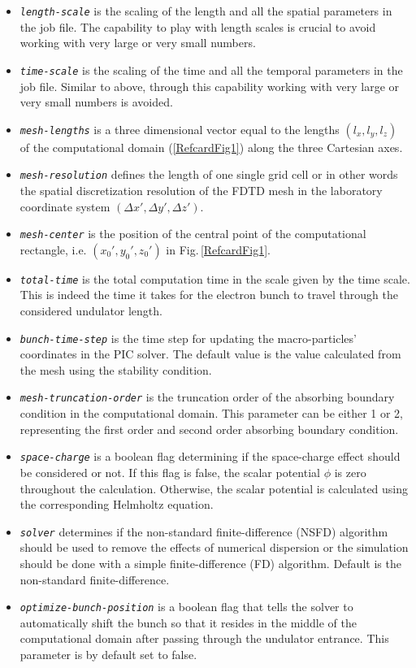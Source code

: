 \begin{itemize}
	\item {\tt \em \small length-scale} is the scaling of the length and all the spatial parameters in the job file. The capability to play with length scales is crucial to avoid working with very large or very small numbers.
	\item {\tt \em \small time-scale} is the scaling of the time and all the temporal parameters in the job file. Similar to above, through this capability working with very large or very small numbers is avoided.
	\item {\tt \em \small mesh-lengths} is a three dimensional vector equal to the lengths $(l_x,l_y,l_z)$ of the computational domain (\ref{RefcardFig1}) along the three Cartesian axes.
	\item {\tt \em \small mesh-resolution} defines the length of one single grid cell or in other words the spatial discretization resolution of the FDTD mesh in the laboratory coordinate system $(\Delta x',\Delta y',\Delta z')$.
	\item {\tt \em \small mesh-center} is the position of the central point of the computational rectangle, i.e. $(x_0',y_0',z_0')$ in Fig.\,\ref{RefcardFig1}.
	\item {\tt \em \small total-time} is the total computation time in the scale given by the time scale. This is indeed the time it takes for the electron bunch to travel through the considered undulator length.
	\item {\tt \em \small bunch-time-step} is the time step for updating the macro-particles' coordinates in the PIC solver. The default value is the value calculated from the mesh using the stability condition.
	\item {\tt \em \small mesh-truncation-order} is the truncation order of the absorbing boundary condition in the computational domain. This parameter can be either 1 or 2, representing the first order and second order absorbing boundary condition.
	\item {\tt \em \small space-charge} is a boolean flag determining if the space-charge effect should be considered or not. If this flag is false, the scalar potential $\phi$ is zero throughout the calculation. Otherwise, the scalar potential is calculated using the corresponding Helmholtz equation.
	\item {\tt \em \small solver} determines if the non-standard finite-difference (NSFD) algorithm should be used to remove the effects of numerical dispersion or the simulation should be done with a simple finite-difference (FD) algorithm. Default is the non-standard finite-difference.
	\item {\tt \em \small optimize-bunch-position} is a boolean flag that tells the solver to automatically shift the bunch so that it resides in the middle of the computational domain after passing through the undulator entrance. This parameter is by default set to false.
\end{itemize}

